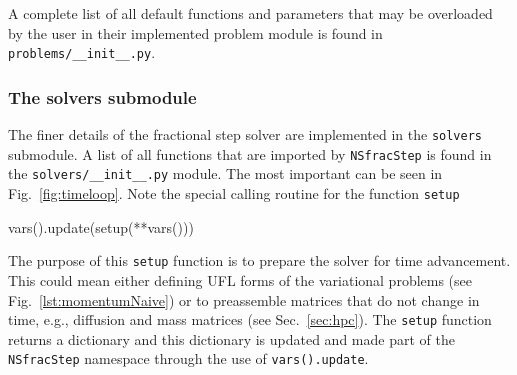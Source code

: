 \documentclass[final,3p,times,twocolumn]{elsarticle}
\newcommand{\inpyth}{\lstinline[style=inlinestyle]} %[]%
\begin{document}
A complete list of all default functions and parameters that may be overloaded by the user in their implemented problem module is found in \inpyth{problems/__init__.py}.

%

\subsubsection*{The solvers submodule}

The finer details of the fractional step solver are implemented in the \inpyth{solvers} submodule. A list of all functions that are imported by \inpyth{NSfracStep} is found in the \inpyth{solvers/__init__.py} module. The most important can be seen in Fig.~\ref{fig:timeloop}. Note the special calling routine for the function \inpyth{setup}
\begin{python}
vars().update(setup(**vars()))
\end{python}
The purpose of this \inpyth{setup} function is to prepare the solver for time advancement. This could mean either defining UFL forms of the variational problems (see Fig.~\ref{lst:momentumNaive}) or to preassemble matrices that do not change in time, e.g., diffusion and mass matrices (see Sec.~\ref{sec:hpc}). The \inpyth{setup} function returns a dictionary and this dictionary is updated and made part of the \inpyth{NSfracStep} namespace through the use of \inpyth{vars().update}.
\end{document}
